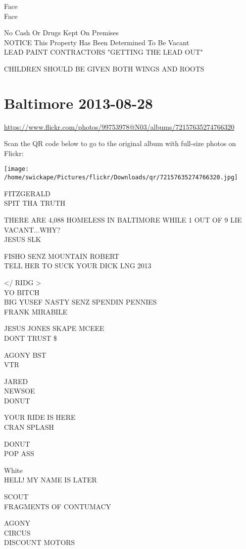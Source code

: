 \documentclass[10pt,letterpaper]{article}
\begin{document}
Face\\
Face

No Cash Or Drugs Kept On Premises\\
NOTICE This Property Has Been Determined To Be Vacant\\
LEAD PAINT CONTRACTORS "GETTING THE LEAD OUT"

CHILDREN SHOULD BE GIVEN BOTH WINGS AND ROOTS
\pagebreak

\section*{Baltimore 2013-08-28}

\url{https://www.flickr.com/photos/99753978@N03/albums/72157635274766320}

Scan the QR code below to go to the original album with full-size photos on Flickr:

\texttt{[image: /home/swickape/Pictures/flickr/Downloads/qr/72157635274766320.jpg]}
\pagebreak

FITZGERALD\\
SPIT THA TRUTH

THERE ARE 4,088 HOMELESS IN BALTIMORE WHILE 1 OUT OF 9 LIE VACANT...WHY?\\
JESUS SLK

FISHO SENZ MOUNTAIN ROBERT\\
TELL HER TO SUCK YOUR DICK LNG 2013

</  RIDG >\\
YO BITCH\\
BIG YUSEF NASTY SENZ SPENDIN PENNIES\\
FRANK MIRABILE

JESUS JONES SKAPE MCEEE\\
DONT TRUST \$

AGONY BST\\
VTR

JARED\\
NEWSOE\\
DONUT

YOUR RIDE IS HERE\\
CRAN SPLASH

DONUT\\
POP ASS

White\\
HELL! MY NAME IS LATER

SCOUT\\
FRAGMENTS OF CONTUMACY

AGONY\\
CIRCUS\\
DISCOUNT MOTORS
\end{document}

